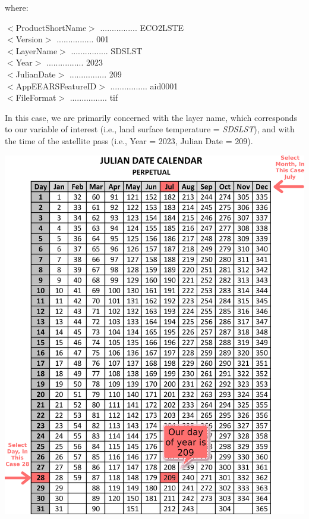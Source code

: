 \documentclass[oneside,a4paper,11pt,explicit]{book}
\begin{document}
where: 

    $<$ProductShortName$>$ ................ ECO2LSTE \\
    $<$Version$>$ ................ 001  \\
    $<$LayerName$>$ ................ SDS\textunderscore LST \\
    $<$Year$>$ ................ 2023  \\
    $<$JulianDate$>$ ................ 209  \\
    $<$AppEEARSFeatureID$>$ ................ aid0001 \\
    $<$FileFormat$>$ ................ tif

\vspace{.5em}

In this case, we are primarily concerned with the layer name, which corresponds to our variable of interest (i.e., land surface temperature = \textit{SDS\textunderscore LST}), and with the time of the satellite pass (i.e., Year = 2023, Julian Date = 209).

\centerline{\includegraphics[width=.9\textwidth]{Julian209.png}}

\end{document}
